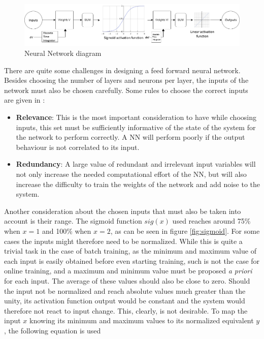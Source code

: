 \begin{figure}[!htb]
  \centering
  \includegraphics[width=1\textwidth]{Figures/NN.png}
  \caption[Neural Network diagram]{Neural Network diagram}
  \label{fig:NN}
\end{figure}

There are quite some challenges in designing a feed forward neural network. Besides choosing the number of layers and neurons per layer, the inputs of the network must also be chosen carefully. Some rules to choose the correct inputs are given in \cite{NN_inputs}:
\begin{itemize}
\item \textbf{Relevance}: This is the most important consideration to have while choosing inputs, this set must be sufficiently informative of the state of the system for the network to perform correctly. A NN will perform poorly if the output behaviour is not correlated to its input.
\item \textbf{Redundancy}: A large value of redundant and irrelevant input variables will not only increase the needed computational effort of the NN, but will also increase the difficulty to train the weights of the network and add noise to the system.
\end{itemize}

Another consideration about the chosen inputs that must also be taken into account is their range. The sigmoid function $sig(x)$ used reaches around 75\% when $x=1$ and 100\% when $x=2$, as can be seen in figure \ref{fig:sigmoid}. For some cases the inputs might therefore need to be normalized. While this is quite a trivial task in the case of batch training, as the minimum and maximum value of each input is easily obtained before even starting training, such is not the case for online training, and a maximum and minimum value must be proposed \emph{a priori} for each input. The average of these values should also be close to zero. Should the input not be normalized and reach absolute values much greater than the unity, its activation function output would be constant and the system would therefore not react to input change. This, clearly, is not desirable. To map the input $x$ knowing its minimum and maximum values to its normalized equivalent $y$, the following equation is used

